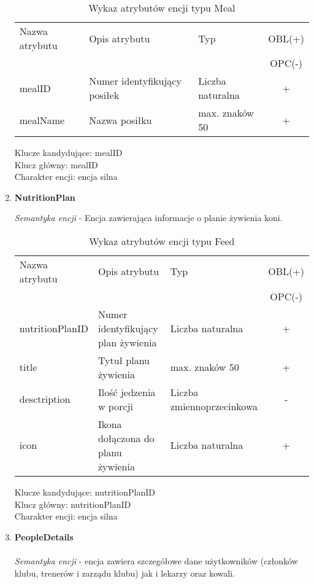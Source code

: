 \documentclass[12pt,twoside]{report}
\begin{document}
\begin{enumerate}[start=10,label={\bfseries ENC$\backslash$0\arabic*}]
	\begin{table}[h!]
		\centering
		\begin{tabular}{|l|l|l|c|}
			\hline
			Nazwa atrybutu & Opis atrybutu & Typ & OBL(+) \\
			& & &  OPC(-) \\
			\hline
			mealID & Numer identyfikujący posiłek & Liczba naturalna & + \\
			\hline
			mealName & Nazwa posiłku & max. znaków 50 & + \\
			\hline
		\end{tabular}
		\caption{Wykaz atrybutów encji typu Meal }
	\end{table}
	Klucze kandydujące: mealID \\
	Klucz główny: mealID \\
	Charakter encji: encja silna \\

\item \textbf{NutritionPlan}

\textit{Semantyka encji} - Encja zawierająca informacje o planie żywienia koni.

\begin{table}[h!]
	\centering
	\begin{tabular}{|l|l|l|c|}
		\hline
		Nazwa atrybutu & Opis atrybutu & Typ & OBL(+) \\
		& & &  OPC(-) \\
		\hline
		nutritionPlanID & Numer identyfikujący plan żywienia & Liczba naturalna & + \\
		\hline
		title &  Tytuł planu żywienia & max. znaków 50 & + \\
		\hline
		desctription &  Ilość jedzenia w porcji & Liczba zmiennoprzecinkowa & - \\
		\hline
		icon &  Ikona dołączona do planu żywienia & Liczba naturalna & + \\
		\hline
	\end{tabular}
	\caption{Wykaz atrybutów encji typu Feed }
\end{table}
Klucze kandydujące: nutritionPlanID \\
Klucz główny: nutritionPlanID \\
Charakter encji: encja silna \\
	\item \textbf{PeopleDetails}\\ \\
	\textit{Semantyka encji} - encja zawiera szczegółowe dane użytkowników (członków klubu, trenerów i zarządu klubu) jak i lekarzy oraz kowali.
	

\end{enumerate}
\end{document}
